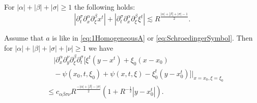 \documentclass[10pt,a4paper]{amsart}
\begin{document}
\begin{lemma}
\label{lem:TimeRegularityHamiltonFlow}
For $|\alpha| + |\beta| + |\sigma| \geq 1$ the following holds:
\begin{equation}
\label{eq:TimeRegularityHamiltonFlow}
|\partial_t^{\sigma} \partial_x^{\alpha} \partial_{\xi}^{\beta} x^t | + |\partial_t^{\sigma} \partial_x^{\alpha} \partial_{\xi}^{\beta} \xi^t | \lesssim R^{\frac{|\alpha| + |\beta| + |\sigma| -1}{2}}.
\end{equation}
\end{lemma}

\begin{lemma}
\label{lem:RegularityPhaseFunction}
Assume that $a$ is like in \eqref{eq:1HomogeneousA} or \eqref{eq:SchroedingerSymbol}. Then for $|\alpha|+|\beta| + |\sigma| + |\nu| \geq 1$ we have
\begin{equation}
\label{eq:RegularityHamiltonII}
\begin{split}
&\quad |\partial_x^{\alpha} \partial_y^{\nu} \partial_{\xi}^{\beta} \partial_t^{\sigma} [ \xi^t (y-x^t) +  \xi_0 (x-x_0) \\
&\quad - \psi(x_0,t,\xi_0) + \psi(x,t,\xi) - \xi_0^t (y-x_0^t)] |_{x=x_0,\xi=\xi_0} \\
&\leq c_{\alpha \beta \sigma \nu} R^{\frac{-|\alpha|+|\beta|-|\sigma|}{2}} (1+R^{-\frac{1}{2}} |y-x_0^t| ).
\end{split}
\end{equation}
\end{lemma}
\end{document}
